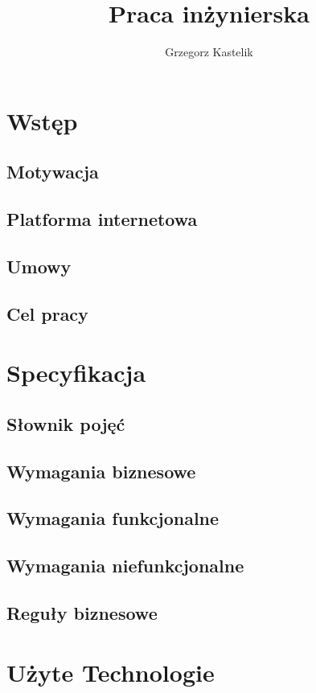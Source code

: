 \documentclass[12pt]{article}
\author{Grzegorz Kastelik}
\title{Praca inżynierska}
\begin{document}
    \maketitle
    \newpage
    \tableofcontents
    \newpage
    \section{Wstęp}
        \subsection{Motywacja}
        
        \subsection{Platforma internetowa}
        
        \subsection{Umowy}
        
        \subsection{Cel pracy}
        
    \section{Specyfikacja}
        \subsection{Słownik pojęć}
        \subsection{Wymagania biznesowe}
        \subsection{Wymagania funkcjonalne}
        \subsection{Wymagania niefunkcjonalne}
        \subsection{Reguły biznesowe}
    \section{Użyte Technologie}
\end{document}

